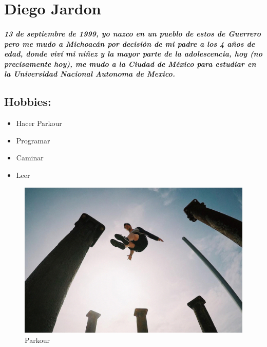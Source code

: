 \chapter{Diego Jardon}
\paragraph{
  13 de septiembre de 1999, yo nazco en un pueblo de estos de Guerrero pero me mudo a Michoacán por decisión de mi padre a los 4 años de edad, donde viví mi niñez y la mayor parte de la adolescencia, hoy (no precisamente hoy), me mudo a la Ciudad de México para estudiar en la Universidad Nacional Autonoma de Mexico.
}

\section{Hobbies:}

\begin{itemize}
    \item{Hacer Parkour}
    \item{Programar}
    \item{Caminar}
    \item{Leer \cite{comunidad}}
\end{itemize}

\begin{figure}[h]
  \centering
  \includegraphics[scale=0.15]{IMG/1.jpg}
  \caption{Parkour}
\end{figure}
